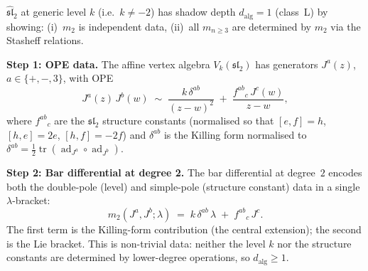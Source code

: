 \begin{computation}
\label{comp:shadow-depth-sl2}

$\hat{\mathfrak{sl}}_2$ at generic level $k$
(i.e.\ $k\neq -2$) has shadow depth $d_{\mathrm{alg}}=1$
(class~L) by showing: (i)~$m_2$ is independent data,
(ii)~all $m_{n\ge 3}$ are determined by $m_2$ via the Stasheff
relations.

\medskip
\noindent\textbf{Step 1: OPE data.}
The affine vertex algebra $V_k(\mathfrak{sl}_2)$ has
generators $J^a(z)$, $a\in\{+,-,3\}$, with OPE
\begin{equation}\label{eq:sl2-ope}
J^a(z)\, J^b(w) \;\sim\;
\frac{k\,\delta^{ab}}{(z-w)^2}
\;+\;
\frac{f^{ab}{}_{c}\, J^c(w)}{z-w},
\end{equation}
where $f^{ab}{}_{c}$ are the $\mathfrak{sl}_2$ structure
constants (normalised so that $[e,f]=h$, $[h,e]=2e$,
$[h,f]=-2f$) and $\delta^{ab}$ is the Killing form
normalised to $\delta^{ab}=\tfrac{1}{2}\operatorname{tr}
(\operatorname{ad}_{J^a}\circ\operatorname{ad}_{J^b})$.

\medskip
\noindent\textbf{Step 2: Bar differential at degree 2.}
The bar differential at degree~$2$ encodes both the
double-pole (level) and simple-pole (structure constant)
data in a single $\lambda$-bracket:
\begin{equation}\label{eq:sl2-m2}
m_2(J^a, J^b;\lambda)
\;=\;
k\,\delta^{ab}\,\lambda
\;+\;
f^{ab}{}_{c}\, J^c.
\end{equation}
The first term is the Killing-form contribution (the
central extension); the second is the Lie bracket.
This is non-trivial data: neither the level $k$ nor the
structure constants are determined by lower-degree
operations, so $d_{\mathrm{alg}}\ge 1$.


\end{computation}

